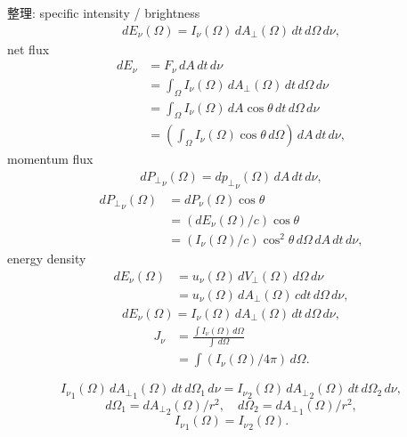 整理: specific intensity / brightness
\begin{align}
    dE_\nu(\Omega)=I_\nu(\Omega)\,dA_\perp(\Omega)\,dt\,d\Omega\,d\nu,
\end{align}
net flux
\begin{align}
    dE_\nu&=F_\nu\,dA\,dt\,d\nu\\
    &=\int_\Omega I_\nu(\Omega)\,dA_\perp(\Omega)\,dt\,d\Omega\,d\nu\\
    &=\int_\Omega I_\nu(\Omega)\,dA\cos\theta\,dt\,d\Omega\,d\nu\\
    &=\left(\int_\Omega I_\nu(\Omega)\cos\theta\,d\Omega\right)\,dA\,dt\,d\nu,
\end{align}
momentum flux
\begin{align}
    d{P_\perp}_\nu(\Omega)=d{p_\perp}_\nu(\Omega)\,dA\,dt\,d\nu,
\end{align}
\begin{align}
    d{P_\perp}_\nu(\Omega)&=dP_\nu(\Omega)\cos\theta\\
    &=(dE_\nu(\Omega)/c)\cos\theta\\
    &=(I_\nu(\Omega)/c)\cos^2\theta\,d\Omega\,dA\,dt\,d\nu,
\end{align}
energy density
\begin{align}
    dE_\nu(\Omega)&=u_\nu(\Omega)\,dV_\perp(\Omega)\,d\Omega\,d\nu\\
    &=u_\nu(\Omega)\,dA_\perp(\Omega)\,cdt\,d\Omega\,d\nu,
\end{align}
\begin{align}
    dE_\nu(\Omega)=I_\nu(\Omega)\,dA_\perp(\Omega)\,dt\,d\Omega\,d\nu,
\end{align}
\begin{align}
    J_\nu&=\frac{\int I_\nu(\Omega)\,d\Omega}{\int \,d\Omega}\\
    &=\int (I_\nu(\Omega)/4\pi)\,d\Omega.
\end{align}

\begin{equation}
    {I_\nu}_1(\Omega)\,{dA_\perp}_1(\Omega)\,dt\,{d\Omega}_1\,d\nu={I_\nu}_2(\Omega)\,{dA_\perp}_2(\Omega)\,dt\,{d\Omega}_2\,d\nu,
\end{equation}
\begin{equation}
    {d\Omega}_1={dA_\perp}_2(\Omega)/r^2,\quad
    {d\Omega}_2={dA_\perp}_1(\Omega)/r^2,
\end{equation}
\begin{equation}
    {I_\nu}_1(\Omega)={I_\nu}_2(\Omega).
\end{equation}

